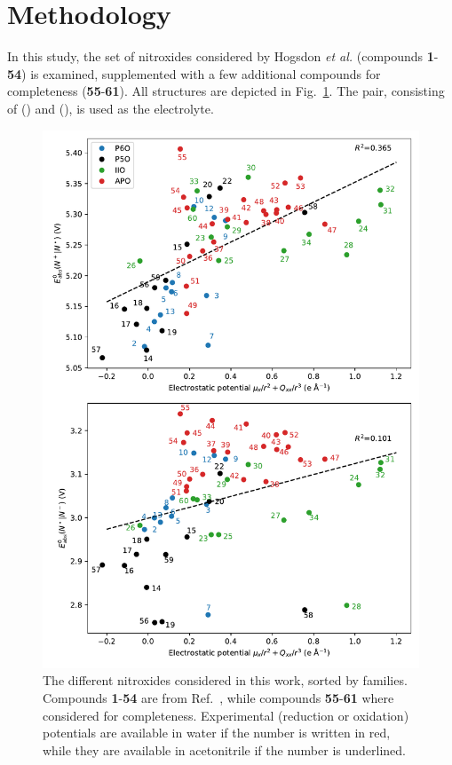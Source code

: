 \documentclass[review]{elsarticle}
\begin{document}
\section{Methodology} \label{sec:methodo}

In this study, the set of nitroxides considered by Hogsdon \textit{et al.} (compounds \textbf{1}-\textbf{54}) is examined, supplemented with a few additional compounds for completeness (\textbf{55}-\textbf{61}). All structures are depicted in Fig.~\ref{fig:nitroxides}. The  pair, consisting of  () and  (), is used as the electrolyte.


\begin{figure}[!p]
\centering
\includegraphics[width=\linewidth]{Figure6}
\caption{The different nitroxides considered in this work, sorted by families. Compounds \textbf{1}-\textbf{54} are from Ref.~, while compounds \textbf{55}-\textbf{61} where considered for completeness. Experimental (reduction or oxidation) potentials are available in water if the number is written in red, while they are available in acetonitrile if the number is underlined.}
\label{fig:nitroxides}
\end{figure}
\end{document}
